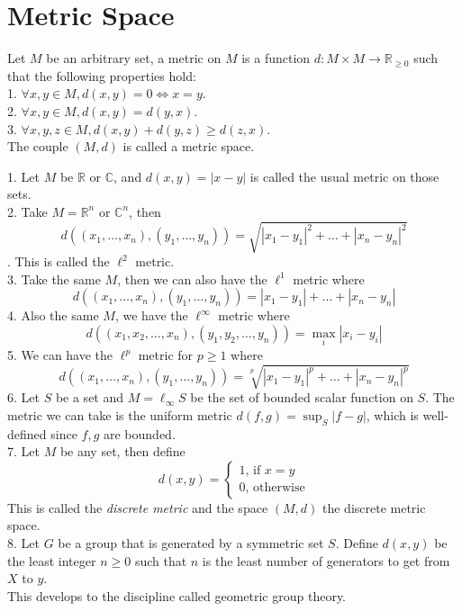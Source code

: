 \section{Metric Space}
\begin{definition}
    Let $M$ be an arbitrary set, a metric on $M$ is a function $d:M\times M\to\mathbb R_{\ge 0}$ such that the following properties hold:\\
    1. $\forall x,y\in M,d(x,y)=0\iff x=y$.\\
    2. $\forall x,y\in M,d(x,y)=d(y,x)$.\\
    3. $\forall x,y,z\in M, d(x,y)+d(y,z)\ge d(z,x)$.\\
    The couple $(M,d)$ is called a metric space.
\end{definition}
\begin{example}
    1. Let $M$ be $\mathbb R$ or $\mathbb C$, and $d(x,y)=|x-y|$ is called the usual metric on those sets.\\
    2. Take $M=\mathbb R^n$ or $\mathbb C^n$, then
    $$d((x_1,\ldots,x_n),(y_1,\ldots,y_n))=\sqrt{|x_1-y_1|^2+\ldots+|x_n-y_n|^2}$$.
    This is called the $\ell^2$ metric.\\
    3. Take the same $M$, then we can also have the $\ell^1$ metric where
    $$d((x_1,\ldots,x_n),(y_1,\ldots,y_n))=|x_1-y_1|+\ldots+|x_n-y_n|$$
    4. Also the same $M$, we have the $\ell^\infty$ metric where
    $$d((x_1,x_2,\ldots,x_n),(y_1,y_2,\ldots,y_n))=\max_{i}|x_i-y_i|$$
    5. We can have the $\ell^p$ metric for $p\ge 1$ where
    $$d((x_1,\ldots,x_n),(y_1,\ldots,y_n))=\sqrt[p]{|x_1-y_1|^p+\ldots+|x_n-y_n|^p}$$
    6. Let $S$ be a set and $M=\ell_\infty S$ be the set of bounded scalar function on $S$.
    The metric we can take is the uniform metric $d(f,g)=\sup_S|f-g|$, which is well-defined since $f,g$ are bounded.\\
    7. Let $M$ be any set, then define
    $$d(x,y)=\begin{cases}
        1\text{, if $x=y$}\\
        0\text{, otherwise}
    \end{cases}$$
    This is called the \textit{discrete metric} and the space $(M,d)$ the discrete metric space.\\
    8. Let $G$ be a group that is generated by a symmetric set $S$.
    Define $d(x,y)$ be the least integer $n\ge 0$ such that $n$ is the least number of generators to get from $X$ to $y$.\\
    This develops to the discipline called geometric group theory.\\

\end{example}

